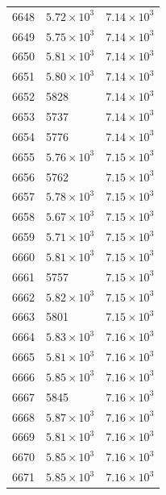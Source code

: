 \begin{table}[H]
\begin{tabular}{lll}
6648 & $\displaystyle 5.72 \times 10^{3}$ & $\displaystyle 7.14 \times 10^{3}$ \\
6649 & $\displaystyle 5.75 \times 10^{3}$ & $\displaystyle 7.14 \times 10^{3}$ \\
6650 & $\displaystyle 5.81 \times 10^{3}$ & $\displaystyle 7.14 \times 10^{3}$ \\
6651 & $\displaystyle 5.80 \times 10^{3}$ & $\displaystyle 7.14 \times 10^{3}$ \\
6652 & 5828 & $\displaystyle 7.14 \times 10^{3}$ \\
6653 & 5737 & $\displaystyle 7.14 \times 10^{3}$ \\
6654 & 5776 & $\displaystyle 7.14 \times 10^{3}$ \\
6655 & $\displaystyle 5.76 \times 10^{3}$ & $\displaystyle 7.15 \times 10^{3}$ \\
6656 & 5762 & $\displaystyle 7.15 \times 10^{3}$ \\
6657 & $\displaystyle 5.78 \times 10^{3}$ & $\displaystyle 7.15 \times 10^{3}$ \\
6658 & $\displaystyle 5.67 \times 10^{3}$ & $\displaystyle 7.15 \times 10^{3}$ \\
6659 & $\displaystyle 5.71 \times 10^{3}$ & $\displaystyle 7.15 \times 10^{3}$ \\
6660 & $\displaystyle 5.81 \times 10^{3}$ & $\displaystyle 7.15 \times 10^{3}$ \\
6661 & 5757 & $\displaystyle 7.15 \times 10^{3}$ \\
6662 & $\displaystyle 5.82 \times 10^{3}$ & $\displaystyle 7.15 \times 10^{3}$ \\
6663 & 5801 & $\displaystyle 7.15 \times 10^{3}$ \\
6664 & $\displaystyle 5.83 \times 10^{3}$ & $\displaystyle 7.16 \times 10^{3}$ \\
6665 & $\displaystyle 5.81 \times 10^{3}$ & $\displaystyle 7.16 \times 10^{3}$ \\
6666 & $\displaystyle 5.85 \times 10^{3}$ & $\displaystyle 7.16 \times 10^{3}$ \\
6667 & 5845 & $\displaystyle 7.16 \times 10^{3}$ \\
6668 & $\displaystyle 5.87 \times 10^{3}$ & $\displaystyle 7.16 \times 10^{3}$ \\
6669 & $\displaystyle 5.81 \times 10^{3}$ & $\displaystyle 7.16 \times 10^{3}$ \\
6670 & $\displaystyle 5.85 \times 10^{3}$ & $\displaystyle 7.16 \times 10^{3}$ \\
6671 & $\displaystyle 5.85 \times 10^{3}$ & $\displaystyle 7.16 \times 10^{3}$ \\

\end{tabular}
\end{table}
